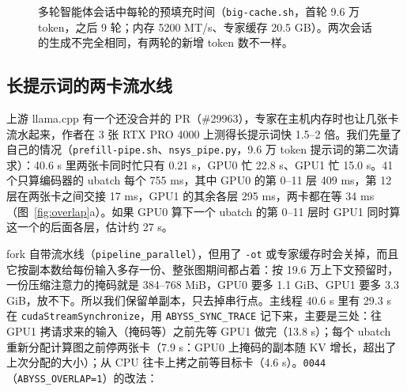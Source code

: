 \documentclass[11pt,a4paper]{article}
\newcommand{\code}[1]{\texttt{#1}}
\begin{document}
\begin{figure}[t]
  \centering
  \caption{多轮智能体会话中每轮的预填充时间（\code{big-cache.sh}，首轮 9.6 万 token，之后 9 轮；内存 5200 MT/s、专家缓存 20.5 GB）。两次会话的生成不完全相同，有两轮的新增 token 数不一样。}
  \label{fig:bigcache}
\end{figure}

\subsection{长提示词的两卡流水线}
\label{sec:overlap}

上游 llama.cpp 有一个还没合并的 PR（\#29963），专家在主机内存时也让几张卡流水起来，作者在 3 张 RTX PRO 4000 上测得长提示词快 1.5--2 倍。我们先量了自己的情况（\code{prefill-pipe.sh}、\code{nsys\_pipe.py}，9.6 万 token 提示词的第二次请求）：40.6 s 里两张卡同时忙只有 0.21 s，GPU0 忙 22.8 s、GPU1 忙 15.0 s。41 个只算编码器的 ubatch 每个 755 ms，其中 GPU0 的第 0--11 层 409 ms，第 12 层在两张卡之间交接 17 ms，GPU1 的其余各层 295 ms，两卡都在等 34 ms（图~\ref{fig:overlap}a）。如果 GPU0 算下一个 ubatch 的第 0--11 层时 GPU1 同时算这一个的后面各层，估计约 27 s。

fork 自带流水线（\code{pipeline\_parallel}），但用了 \code{-ot} 或专家缓存时会关掉，而且它按副本数给每份输入多存一份、整张图期间都占着：按 19.6 万上下文预留时，一份压缩注意力的掩码就是 384--768 MiB，GPU0 要多 1.1 GiB、GPU1 要多 3.3 GiB，放不下。所以我们保留单副本，只去掉串行点。主线程 40.6 s 里有 29.3 s 在 \code{cudaStreamSynchronize}，用 \code{ABYSS\_SYNC\_TRACE} 记下来，主要是三处：往 GPU1 拷请求来的输入（掩码等）之前先等 GPU1 做完（13.8 s）；每个 ubatch 重新分配计算图之前停两张卡（7.9 s：GPU0 上掩码的副本随 KV 增长，超出了上次分配的大小）；从 CPU 往卡上拷之前等目标卡（4.6 s）。\code{0044}（\code{ABYSS\_OVERLAP=1}）的改法：
\end{document}
